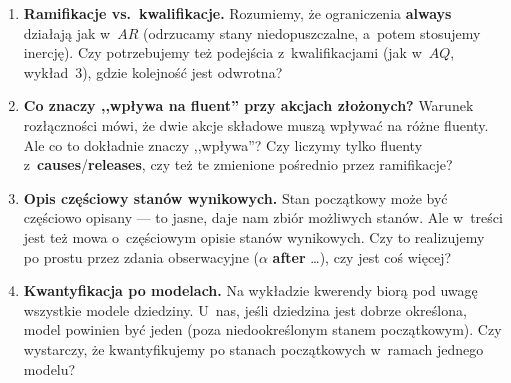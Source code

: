 \documentclass[11pt,a4paper]{article}
\newcommand{\causes}{\textbf{causes}}
\newcommand{\aft}{\textbf{after}}
\newcommand{\always}{\textbf{always}}
\newcommand{\releases}{\textbf{releases}}
\begin{document}
\begin{enumerate}
  \item \textbf{Ramifikacje vs.\ kwalifikacje.}
    Rozumiemy, że ograniczenia \always{} działają jak w~$AR$
    (odrzucamy stany niedopuszczalne, a~potem stosujemy inercję).
    Czy potrzebujemy też podejścia z~kwalifikacjami (jak w~$AQ$, wykład~3),
    gdzie kolejność jest odwrotna?

  \item \textbf{Co znaczy ,,wpływa na fluent'' przy akcjach złożonych?}
    Warunek rozłączności mówi, że dwie akcje składowe muszą wpływać
    na różne fluenty. Ale co to dokładnie znaczy ,,wpływa''?
    Czy liczymy tylko fluenty z~\causes{}/\releases{},
    czy też te zmienione pośrednio przez ramifikacje?

  \item \textbf{Opis częściowy stanów wynikowych.}
    Stan początkowy może być częściowo opisany --- to jasne, daje nam
    zbiór możliwych stanów. Ale w~treści jest też mowa o~częściowym opisie
    stanów wynikowych. Czy to realizujemy po prostu przez zdania
    obserwacyjne ($\alpha$ \aft{} \ldots), czy jest coś więcej?

  \item \textbf{Kwantyfikacja po modelach.}
    Na wykładzie kwerendy biorą pod uwagę wszystkie modele dziedziny.
    U~nas, jeśli dziedzina jest dobrze określona, model powinien być jeden
    (poza niedookreślonym stanem początkowym).
    Czy wystarczy, że kwantyfikujemy po stanach początkowych w~ramach
    jednego modelu?
\end{enumerate}
\end{document}
